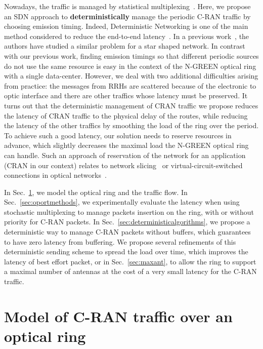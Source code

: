 \documentclass[10pt, conference, letterpaper]{IEEEtran}
\begin{document}
Nowadays, the traffic is managed by statistical multiplexing~\cite{kern2006applying}. Here, we propose an SDN approach to {\bf deterministically} manage the periodic C-RAN traffic by choosing emission timing. Indeed, Deterministic Networking is one of the main method considered to reduce the end-to-end latency~\cite{finn-detnet-architecture-08}. In a previous work~\cite{dominique2018deterministic}, the authors have studied a similar problem for a star shaped network. In contrast with our previous work, finding emission timings so that different periodic sources do not use the same resource is easy in the context of the N-GREEN optical ring with a single data-center. However, we deal with two additional difficulties arising from practice: the messages from RRHs are scattered because of the electronic to optic interface and there are other traffics whose latency must be preserved. It turns out that the deterministic management of CRAN traffic we propose reduces the latency of CRAN traffic to the physical delay of the routes, while reducing the latency of the other traffics by smoothing the load of the ring over the period. To achieve such a good latency, our solution needs to reserve resources in advance, which slightly decreases the maximal load the N-GREEN optical ring can handle. Such an approach of reservation of the network for an application (CRAN in our context) relates to network slicing~\cite{jiang2016network} or virtual-circuit-switched connections in optical networks~\cite{cadere2010virtual,szymanski2016ultra}.

In Sec.~\ref{sec:model}, we model the optical ring and the traffic flow. In Sec.~\ref{sec:oportmethods}, we experimentally evaluate the latency when using stochastic multiplexing to manage packets insertion on the ring, with or without priority for C-RAN packets. In Sec.~\ref{sec:deterministicalgorithms}, we propose a deterministic way to manage C-RAN packets without buffers, which guarantees to have zero latency from buffering. We propose several refinements of this deterministic sending scheme to spread the load over time, which improves the latency of best effort packet, or in Sec.~\ref{sec:maxant}, to allow the ring to support a maximal number of antennas at the cost of a very small latency for the C-RAN traffic. 

\section{Model of C-RAN traffic over an optical ring}
\label{sec:model}
    
\end{document}
